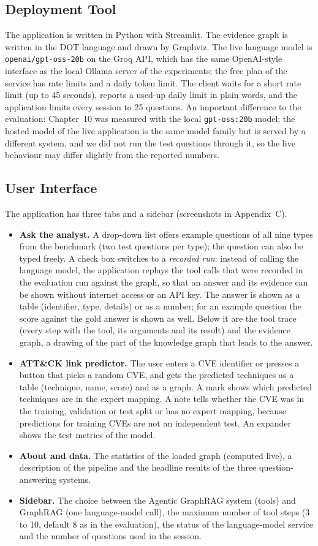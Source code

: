 \documentclass[12pt, a4paper]{article}
\begin{document}
\subsection{Deployment Tool}
The application is written in Python with Streamlit. The evidence graph is written in the DOT language and drawn by Graphviz. The live language model is \texttt{openai/gpt-oss-20b} on the Groq API, which has the same OpenAI-style interface as the local Ollama server of the experiments; the free plan of the service has rate limits and a daily token limit. The client waits for a short rate limit (up to 45 seconds), reports a used-up daily limit in plain words, and the application limits every session to 25 questions. An important difference to the evaluation: Chapter~10 was measured with the local \texttt{gpt-oss:20b} model; the hosted model of the live application is the same model family but is served by a different system, and we did not run the test questions through it, so the live behaviour may differ slightly from the reported numbers.
\subsection{User Interface}
The application has three tabs and a sidebar (screenshots in Appendix~C).
\begin{itemize}[noitemsep, topsep=2pt]
    \item \textbf{Ask the analyst.} A drop-down list offers example questions of all nine types from the benchmark (two test questions per type); the question can also be typed freely. A check box switches to a \emph{recorded run}: instead of calling the language model, the application replays the tool calls that were recorded in the evaluation run against the graph, so that an answer and its evidence can be shown without internet access or an API key. The answer is shown as a table (identifier, type, details) or as a number; for an example question the score against the gold answer is shown as well. Below it are the tool trace (every step with the tool, its arguments and its result) and the evidence graph, a drawing of the part of the knowledge graph that leads to the answer.
    \item \textbf{ATT\&CK link predictor.} The user enters a CVE identifier or presses a button that picks a random CVE, and gets the predicted techniques as a table (technique, name, score) and as a graph. A mark shows which predicted techniques are in the expert mapping. A note tells whether the CVE was in the training, validation or test split or has no expert mapping, because predictions for training CVEs are not an independent test. An expander shows the test metrics of the model.
    \item \textbf{About and data.} The statistics of the loaded graph (computed live), a description of the pipeline and the headline results of the three question-answering systems.
    \item \textbf{Sidebar.} The choice between the Agentic GraphRAG system (tools) and GraphRAG (one language-model call), the maximum number of tool steps (3 to 10, default 8 as in the evaluation), the status of the language-model service and the number of questions used in the session.
\end{itemize}
\end{document}

